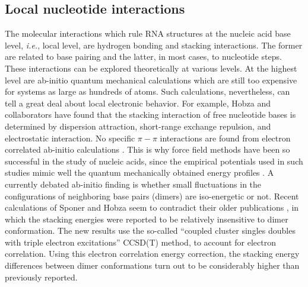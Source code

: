 \subsection{Local nucleotide interactions}
The molecular interactions which rule RNA structures at the nucleic
acid base level, \textit{i.e.}, local level, are hydrogen bonding and
stacking interactions. The former are related to base pairing and
the latter, in most cases, to nucleotide steps. These interactions
can be explored theoretically at various levels. At the highest
level are ab-initio quantum mechanical calculations which are still
too expensive for systems as large as hundreds of atoms. Such
calculations, nevertheless, can tell a great deal about local
electronic behavior. For example, Hobza and collaborators have found
that the stacking interaction of free nucleotide bases is determined
by dispersion attraction, short-range exchange repulsion, and electrostatic
interaction. No specific $\pi-\pi$ interactions are found from
electron correlated ab-initio calculations \cite{sponer1996,
sponer1997}. This is why force field methods have been so successful
in the study of nucleic acids, since the empirical potentials used
in such studies mimic well the quantum mechanically obtained energy
profiles \cite{tung2004, sponer2000}.
A currently debated ab-initio finding is whether small fluctuations
in the configurations of neighboring base pairs (dimers) are
iso-energetic or not. Recent calculations of Sponer and Hobza
\cite{sponer2006} seem to contradict their older publications
\cite{sponer2000, hobza2002}, in which the stacking energies were
reported to be relatively insensitive to dimer conformation. The new
results use the so-called ``coupled cluster singles doubles with triple electron
excitations'' CCSD(T) method, to account for electron correlation.
Using this electron correlation energy correction, the stacking
energy differences between dimer conformations turn out to be
considerably higher than previously reported.

